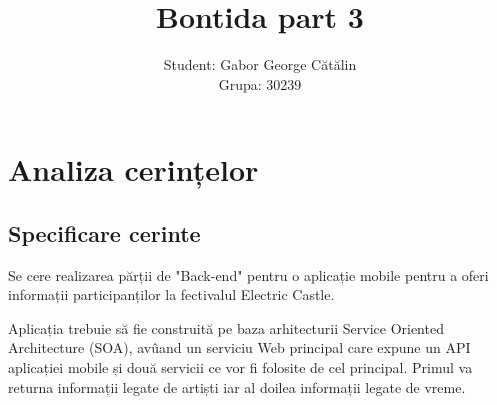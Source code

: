 \documentclass[11pt,a4paper,twoside,notitlepage]{article}
\begin{document}
\title{Bontida part 3}

\author{
Student: Gabor George C\u{a}t\u{a}lin\\ %
Grupa: 30239\\
}

\maketitle 

\newpage

\tableofcontents



\newpage

\section{Analiza cerințelor}

\subsection{Specificare cerinte}
Se cere realizarea părții de "Back-end" pentru o aplicație mobile pentru a oferi informații participanților la fectivalul Electric Castle. \par
	Aplicația trebuie să fie construită pe baza arhitecturii Service Oriented Architecture (SOA), av\^u{a}nd un serviciu Web principal care expune un API aplicației mobile și două servicii ce vor fi folosite de cel principal. Primul va returna informații legate de artiști iar al doilea informații legate de vreme.
\end{document}
